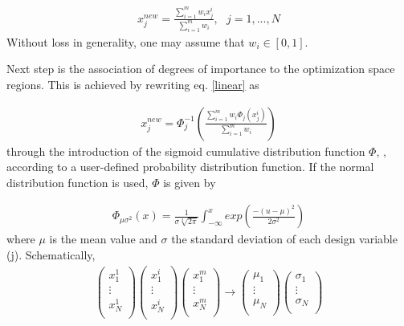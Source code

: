 \begin{eqnarray}
   x_j^{new} = \frac{\sum_{i=1}^{m}w_i x_j^i}{\sum_{i=1}^{m}w_i },~~~ j=1,...,N 
   \label{linear} 
\end{eqnarray}
Without loss in generality, one may assume that $w_i \in [0,1]$. 

Next step is the association of degrees of importance to the optimization space regions. This is achieved by rewriting eq. \ref{linear} as

\begin{eqnarray}
   x_j^{new} = \Phi _j^{-1} (\frac{\sum_{i=1}^{m}w_i \Phi _j(x_j^i)}{\sum_{i=1}^{m}w_i }) 
   \label{non-linear} 
\end{eqnarray}
through the introduction of the sigmoid cumulative distribution function $\Phi$,  \cite{Kiemele}, according to a user-defined probability distribution function. If the normal distribution function is used, $\Phi$ is given by

\begin{eqnarray}
   \Phi _{\mu \sigma ^2} (x)= \frac{1}{\sigma\sqrt[2]{2\pi}}\int _{-\infty}^x exp(\frac{-(u-\mu)^2}{2 \sigma^2}) 
   \label{cdf} 
\end{eqnarray}
where $\mu$ is the mean value and $\sigma$ the standard deviation of each design variable (j). Schematically,
\begin{eqnarray}
		\left( {\begin{array}{c}
 		x_1^1  \\
 		\vdots  \\
 		x_N^1	\\
 		\end{array} } \right) 
 		\left( {\begin{array}{c}
 		x_1^i  \\
 		\vdots  \\
 		x_N^i	\\
 		\end{array} } \right)
 		\left( {\begin{array}{c}
 		x_1^m  \\
 		\vdots  \\
 		x_N^m	\\
 		\end{array} } \right) \rightarrow
		\left( {\begin{array}{c}
 		\mu _1  \\
 		\vdots  \\
 		\mu _N  \\
 		\end{array} } \right)
		\left( {\begin{array}{c}
 		\sigma _1  \\
 		\vdots  \\
 		\sigma _N  \\
 		\end{array} } \right)
   \label{cdf-matrix} 
\end{eqnarray}


